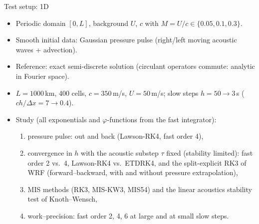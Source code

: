 \documentclass[aspectratio=169,10pt]{beamer}
\newcommand{\ph}{\varphi}
\begin{document}
\begin{frame}{Test setup: 1D}
  \begin{itemize}
    \item Periodic domain $[0,L]$, background $U$, $c$ with $M=U/c\in\{0.05,0.1,0.3\}$.
    \item Smooth initial data: Gaussian pressure pulse (right/left moving acoustic waves + advection).
    \item Reference: exact semi-discrete solution (circulant operators commute: analytic in Fourier space).
    \item $L=1000$\,km, 400 cells, $c=350$\,m/s, $U=50$\,m/s; slow steps $h=50\to3$\,s ($ch/\Delta x=7\to0.4$).
    \item Study (all exponentials and $\ph$-functions from the fast integrator):
    \begin{enumerate}
      \item pressure pulse: out and back (Lawson-RK4, fast order 4),
      \item convergence in $h$ with the acoustic substep $\tau$ fixed (stability limited): fast order 2 vs.\ 4, Lawson-RK4 vs.\ ETDRK4,
      and the split-explicit RK3 of WRF (forward--backward, with and without pressure extrapolation),
      \item MIS methods (RK3, MIS-KW3, MIS54) and the linear acoustics stability test of Knoth--Wensch,
      \item work--precision: fast order 2, 4, 6 at large and at small slow steps.
    \end{enumerate}
  \end{itemize}
\end{frame}
\end{document}
